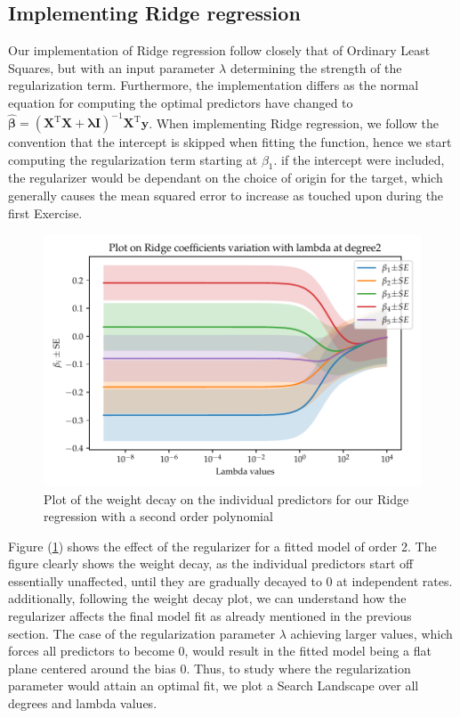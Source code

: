 \documentclass[11pt, a4paper]{article}
\begin{document}
\subsection*{Implementing Ridge regression}
Our implementation of Ridge regression follow closely that of Ordinary Least Squares, but with an input parameter $\lambda$ determining the strength of the regularization term. Furthermore, the implementation differs as the normal equation for computing the optimal predictors have changed to $\bm{\hat{\beta}} = \left(\bm{X}^\text{T}\bm{X} + \bm{\lambda}\bm{I}\right)^{-1}\bm{X}^\text{T}\bm{y}$. When implementing Ridge regression, we follow the convention that the intercept is skipped when fitting the function, hence we start computing the regularization term starting at $\beta_1$. \cite{Geron2019} if the intercept were included, the regularizer would be dependant on the choice of origin for the target, which generally causes the mean squared error to increase as touched upon during the first Exercise.

\begin{figure}
  \centering
  \includegraphics[scale=0.75]{figures/EX4_beta_plot_ridge_2.pdf}
  \caption{\label{fig:ridge_beta_1}Plot of the weight decay on the individual predictors for our Ridge regression with a second order polynomial}
\end{figure}

Figure (\ref{fig:ridge_beta_1}) shows the effect of the regularizer for a fitted model of order 2. The figure clearly shows the weight decay, as the individual predictors start off essentially unaffected, until they are gradually decayed to 0 at independent rates. additionally, following the weight decay plot, we can understand how the regularizer affects the final model fit as already mentioned in the previous section. The case of the regularization parameter $\lambda$ achieving larger values, which forces all predictors to become 0, would result in the fitted model being a flat plane centered around the bias 0. Thus, to study where the regularization parameter would attain an optimal fit, we plot a Search Landscape over all degrees and lambda values.
\end{document}
